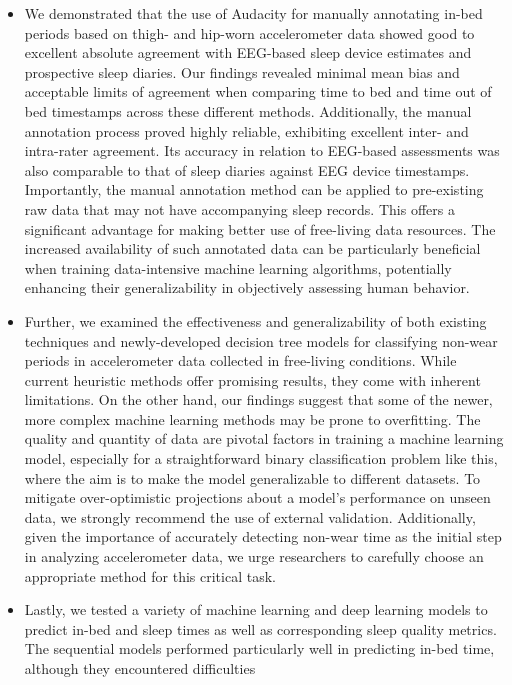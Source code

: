 \documentclass[
  10pt,
]{scrbook}
\begin{document}
\begin{itemize}
\item
  We demonstrated that the use of Audacity for manually annotating
  in-bed periods based on thigh- and hip-worn accelerometer data showed
  good to excellent absolute agreement with EEG-based sleep device
  estimates and prospective sleep diaries. Our findings revealed minimal
  mean bias and acceptable limits of agreement when comparing time to
  bed and time out of bed timestamps across these different methods.
  Additionally, the manual annotation process proved highly reliable,
  exhibiting excellent inter- and intra-rater agreement. Its accuracy in
  relation to EEG-based assessments was also comparable to that of sleep
  diaries against EEG device timestamps. Importantly, the manual
  annotation method can be applied to pre-existing raw data that may not
  have accompanying sleep records. This offers a significant advantage
  for making better use of free-living data resources. The increased
  availability of such annotated data can be particularly beneficial
  when training data-intensive machine learning algorithms, potentially
  enhancing their generalizability in objectively assessing human
  behavior.
\item
  Further, we examined the effectiveness and generalizability of both
  existing techniques and newly-developed decision tree models for
  classifying non-wear periods in accelerometer data collected in
  free-living conditions. While current heuristic methods offer
  promising results, they come with inherent limitations. On the other
  hand, our findings suggest that some of the newer, more complex
  machine learning methods may be prone to overfitting. The quality and
  quantity of data are pivotal factors in training a machine learning
  model, especially for a straightforward binary classification problem
  like this, where the aim is to make the model generalizable to
  different datasets. To mitigate over-optimistic projections about a
  model's performance on unseen data, we strongly recommend the use of
  external validation. Additionally, given the importance of accurately
  detecting non-wear time as the initial step in analyzing accelerometer
  data, we urge researchers to carefully choose an appropriate method
  for this critical task.
\item
  Lastly, we tested a variety of machine learning and deep learning
  models to predict in-bed and sleep times as well as corresponding
  sleep quality metrics. The sequential models performed particularly
  well in predicting in-bed time, although they encountered difficulties

\end{itemize}
\end{document}
